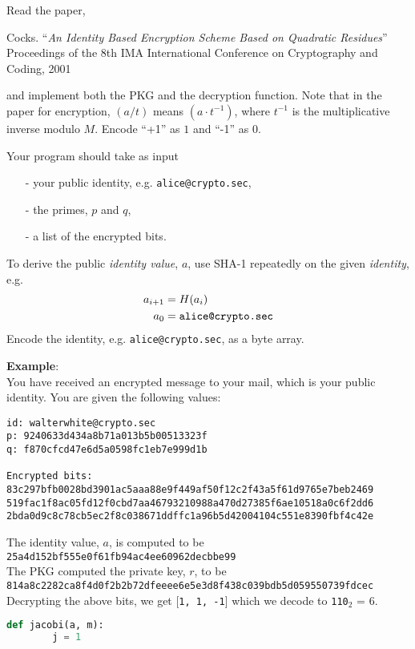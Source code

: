 \documentclass{article}
\begin{document}
\begin{description}
{    Read the paper,
    \begin{center}
	\begin{minipage}{0.8\textwidth}
	Cocks. ``\emph{An Identity Based Encryption Scheme Based on Quadratic Residues}'' 
    Proceedings of the 8th IMA International Conference on Cryptography and Coding, 2001
	\end{minipage}
	\end{center}
    and implement both the PKG and the decryption function. Note that in the paper for encryption, 
    $(a / t)$ means $(a \cdot t^{-1})$, where $t^{-1}$ is the multiplicative inverse modulo $M$.
    Encode ``+1'' as $1$ and ``-1'' as $0$.
    
    Your program should take as input
    \begin{itemize}
        \item[-] your public identity, e.g. \texttt{alice@crypto.sec},
        \item[-] the primes, $p$ and $q$,
        \item[-] a list of the encrypted bits.
    \end{itemize}
    To derive the public \emph{identity value}, $a$, use SHA-1 repeatedly on the given \emph{identity}, e.g.
    \begin{align*}
    a_{i+1} &= H(a_i) \\
    a_0 &= \text{\texttt{alice@crypto.sec}}
    \end{align*}
    Encode the identity, e.g. \texttt{alice@crypto.sec}, as a byte array.
    
    \textbf{Example}:\\
    You have received an encrypted message to your mail, which is your public identity.
    You are given the following values:
    \begin{verbatim}
id: walterwhite@crypto.sec
p: 9240633d434a8b71a013b5b00513323f
q: f870cfcd47e6d5a0598fc1eb7e999d1b

Encrypted bits:
83c297bfb0028bd3901ac5aaa88e9f449af50f12c2f43a5f61d9765e7beb2469
519fac1f8ac05fd12f0cbd7aa46793210988a470d27385f6ae10518a0c6f2dd6
2bda0d9c8c78cb5ec2f8c038671ddffc1a96b5d42004104c551e8390fbf4c42e
	\end{verbatim}
    The identity value, $a$, is computed to be\\
    \texttt{25a4d152bf555e0f61fb94ac4ee60962decbbe99}\\
    The PKG computed the private key, $r$, to be\\
    \texttt{814a8c2282ca8f4d0f2b2b72dfeeee6e5e3d8f438c039bdb5d059550739fdcec}\\
    Decrypting the above bits, we get [\texttt{1, 1, -1}] which we decode to \texttt{110}$_2$ = $6$.
    \begin{lstlisting}[float=htb, style=customc, language=python, caption={The Jacobi symbol in Python.}, label={lst:jacobi}]
    def jacobi(a, m):
        j = 1


\end{lstlisting}}
\end{description}
\end{document}
